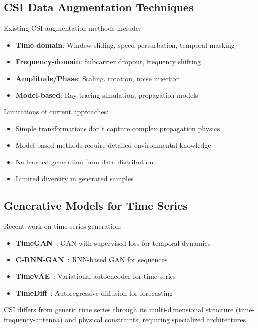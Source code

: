 \documentclass[journal]{IEEEtran}
\begin{document}
\subsection{CSI Data Augmentation Techniques}

Existing CSI augmentation methods include:
\begin{itemize}
\item \textbf{Time-domain}: Window sliding, speed perturbation, temporal masking
\item \textbf{Frequency-domain}: Subcarrier dropout, frequency shifting
\item \textbf{Amplitude/Phase}: Scaling, rotation, noise injection
\item \textbf{Model-based}: Ray-tracing simulation, propagation models
\end{itemize}

Limitations of current approaches:
\begin{itemize}
\item Simple transformations don't capture complex propagation physics
\item Model-based methods require detailed environmental knowledge
\item No learned generation from data distribution
\item Limited diversity in generated samples
\end{itemize}

\subsection{Generative Models for Time Series}

Recent work on time-series generation:
\begin{itemize}
\item \textbf{TimeGAN}~\cite{yoon2019timegan}: GAN with supervised loss for temporal dynamics
\item \textbf{C-RNN-GAN}~\cite{mogren2016crnngan}: RNN-based GAN for sequences
\item \textbf{TimeVAE}~\cite{desai2021timevae}: Variational autoencoder for time series
\item \textbf{TimeDiff}~\cite{rasul2021autoregressive}: Autoregressive diffusion for forecasting
\end{itemize}

CSI differs from generic time series through its multi-dimensional structure (time-frequency-antenna) and physical constraints, requiring specialized architectures.
\end{document}
